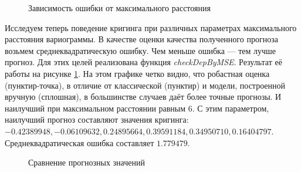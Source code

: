 \begin{figure}[H]
\caption{Зависимость ошибки от максимального расстояния}
\label{img:check-dep}
\end{figure}

Исследуем теперь поведение кригинга при различных параметрах максимального расстояния вариограммы. В качестве оценки качества полученного прогноза возьмем среднеквадратическую ошибку. Чем меньше ошибка --- тем лучше прогноз. Для этих целей реализована функция \textit{checkDepByMSE}. Результат её работы на рисунке \ref{img:check-dep}. На этом графике четко видно, что робастная оценка (пунктир-точка), в отличие от классической (пунктир) и модели, построенной вручную (сплошная), в большинстве случаев даёт более точные прогнозы. И наилучший при максимальном расстоянии равным $6$. С этим параметром, наилучший прогноз составляют значения кригинга: $-0.42389948, -0.06109632, 0.24895664, 0.39591184, 0.34950710, 0.16404797$. Среднеквадратическая ошибка составляет $1.779479$.

\begin{figure}[H]
\caption{Сравнение прогнозных значений}
\label{img:cross-prediction-best}
\end{figure}

